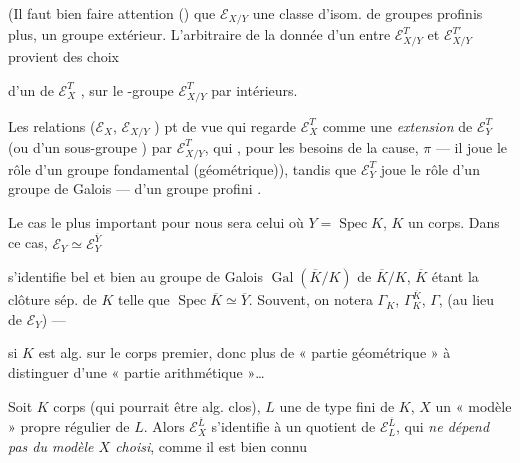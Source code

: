 \documentclass[11pt,a4paper]{article}
\begin{document}
(Il faut bien faire attention ()
que $\mathcal{E}_{X/Y}$  une classe d'isom. de groupes profinis  plus,
\ill{} un groupe extérieur. L'arbitraire de la donnée d'un  entre
$\mathcal{E}^{T}_{X/Y}$ et $\mathcal{E}^{T'}_{X/Y}$ provient des choix

d'un \ill{} de $\mathcal{E}^{T}_{X}$ , 
sur le \ill{}-groupe $\mathcal{E}^{T}_{X/Y}$ par  intérieurs.

Les relations ($\mathcal{E}_X$, $\mathcal{E}_{X/Y}$ )  \ill{} pt de vue qui
regarde $\mathcal{E}^{T}_{X}$ comme une \emph{extension}
de $\mathcal{E}^{T}_{Y}$ (ou d'un sous-groupe ) par $\mathcal{E}^{T}_{X/Y}$,
qui \ill{}, pour les besoins de la cause, \ill{} $\pi$ --- il joue le
rôle d'un groupe fondamental (géométrique)), tandis que $\mathcal{E}^{T}_{Y}$ joue
le rôle d'un groupe de Galois --- d'un groupe profini \ill{}.

Le cas le plus important pour nous
sera celui où $Y = \operatorname{Spec} K$, $K$ un corps.
 Dans ce cas, $\mathcal{E}_{Y} \simeq \mathcal{E}^{\overline{Y}}_{Y}$

s'identifie bel et bien au groupe de Galois $\operatorname{Gal}(\overline{K}/K)$ de \struck{\ill{}} $\overline{K}/K$,
$\overline{K}$ étant la clôture sép. de $K$ telle que $\operatorname{Spec} \overline{K} \simeq \overline{Y}$.
Souvent, on notera $\Gamma_K$, $\Gamma^{\overline{K}}_{K}$, $\Gamma$, (au lieu de $\mathcal{E}_Y$) --- \ill{}

si $K$ est alg. sur le corps premier,  \ill{} donc plus de « partie
géométrique » à distinguer d'une « partie arithmétique »…

Soit $K$ \struck{\ill{}} \add{\ill{}} corps (qui pourrait être alg. clos), $L$ une  de
type fini de $K$, $X$ un « modèle » propre régulier de $L$. Alors
$\mathcal{E}^{\overline{L}}_{X}$ s'identifie à un quotient de $\mathcal{E}^{\overline{L}}_{L}$,
qui \emph{ne dépend pas du modèle $X$ choisi}, comme il est bien connu
\end{document}
